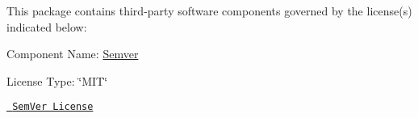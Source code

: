 This package contains third-\/party software components governed by the license(s) indicated below\+:

Component Name\+: \mbox{\hyperlink{namespaceSemver}{Semver}}

License Type\+: \char`\"{}\+M\+I\+T\char`\"{}

\href{https://github.com/maxhauser/semver/blob/master/License.txt}{\texttt{ Sem\+Ver License}} 